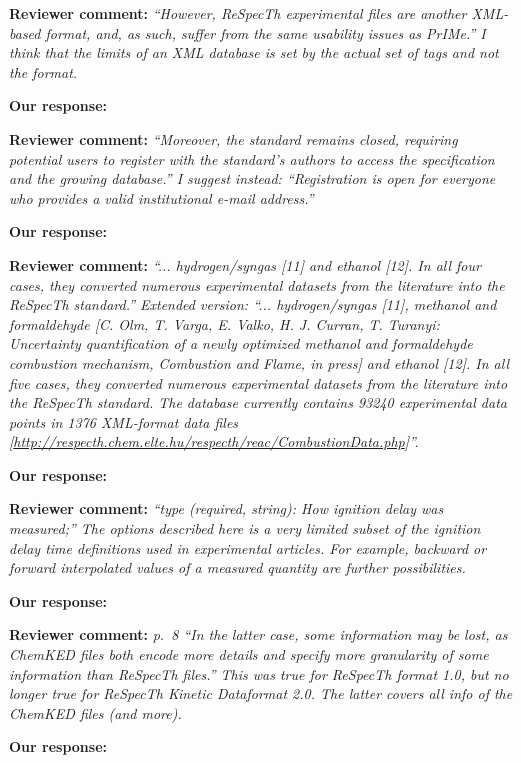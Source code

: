 \documentclass[a4paper,10pt]{elsarticle}
\begin{document}
\textbf{Reviewer comment:}
\textit{``However, ReSpecTh experimental files are another XML-based format, and, as such, suffer from the same usability issues as PrIMe.''
I think that the limits of an XML database is set by the actual set of tags and not the format.
}

\textbf{Our response:}



\textbf{Reviewer comment:}
\textit{``Moreover, the standard remains closed, requiring potential users to register with the standard's authors to access the specification and the growing database.''
I suggest instead:
``Registration is open for everyone who provides a valid institutional e-mail address.''
}

\textbf{Our response:}


\textbf{Reviewer comment:}
\textit{
``... hydrogen/syngas [11] and ethanol [12]. In all four cases, they converted numerous experimental datasets from the literature into the ReSpecTh standard.''
Extended version:
``... hydrogen/syngas [11], methanol and formaldehyde [C. Olm, T. Varga, E. Valko, H. J. Curran, T. Turanyi: Uncertainty quantification of a newly optimized methanol and formaldehyde combustion mechanism, Combustion and Flame, in press] and ethanol [12]. In all five cases, they converted numerous experimental datasets from the literature into the ReSpecTh standard. The database currently contains  93240 experimental data points in 1376 XML-format data files [\url{http://respecth.chem.elte.hu/respecth/reac/CombustionData.php}]''.
}

\textbf{Our response:}



\textbf{Reviewer comment:}
\textit{``type (required, string): How ignition delay was measured;''
The options described here is a very limited subset of the ignition delay time definitions used in experimental articles. For example, backward or forward interpolated values of a measured quantity are further possibilities.  
}

\textbf{Our response:}


\textbf{Reviewer comment:}
\textit{p.~8 ``In the latter case, some information may be lost, as ChemKED files both encode more details and specify more granularity of some information than ReSpecTh files.''
This was true for ReSpecTh format 1.0, but no longer true for ReSpecTh Kinetic Dataformat 2.0. The latter covers all info of the ChemKED files (and more). 
}

\textbf{Our response:}
\end{document}
